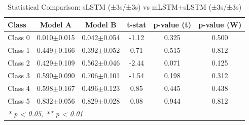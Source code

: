 \begin{table}[htbp]
\centering
\caption{Statistical Comparison: sLSTM (±3s/±3s) vs mLSTM+sLSTM (±3s/±3s)}
\label{tab:comparison_class_slstm_±3s_±3s_vs_mlstmslstm_±3s_±3s}
\begin{tabular}{lccccc}
\toprule
\textbf{Class} & \textbf{Model A} & \textbf{Model B} & \textbf{t-stat} & \textbf{p-value (t)} & \textbf{p-value (W)} \\
\midrule
Class 0 & 0.010$\pm$0.015 & 0.042$\pm$0.054 & -1.12 & 0.325 & 0.500 \\
Class 1 & 0.449$\pm$0.166 & 0.392$\pm$0.052 & 0.71 & 0.515 & 0.812 \\
Class 2 & 0.429$\pm$0.109 & 0.562$\pm$0.046 & -2.44 & 0.071 & 0.125 \\
Class 3 & 0.590$\pm$0.090 & 0.706$\pm$0.101 & -1.54 & 0.198 & 0.312 \\
Class 4 & 0.598$\pm$0.167 & 0.496$\pm$0.123 & 0.85 & 0.445 & 0.438 \\
Class 5 & 0.832$\pm$0.056 & 0.829$\pm$0.028 & 0.08 & 0.944 & 0.812 \\
\bottomrule
\multicolumn{6}{l}{\textit{* p < 0.05, ** p < 0.01}} \\
\end{tabular}
\end{table}